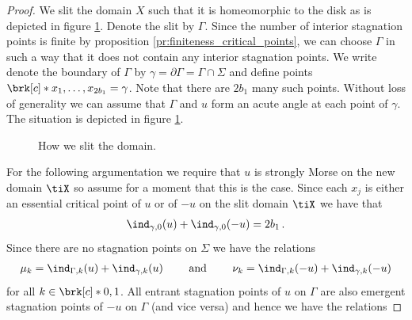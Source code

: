 \begin{proof}
  We slit the domain $X$ such that it is homeomorphic to the disk as is 
  depicted in figure \ref{fi:n2_hvf_slitDomain}.
  Denote the slit by $\Gamma$. Since the number of interior stagnation points is 
  finite by proposition \ref{pr:finiteness_critical_points}, we can choose $\Gamma$ in such a way that it does not contain
  any interior stagnation points.
  We write denote the boundary of $\Gamma$ by $\gamma=\partial\Gamma=\Gamma\cap\Sigma$
  and define points $\brk[c]*{x_1,\dots,x_{2b_1}}=\gamma$.
  Note that there are $2b_1$ many such points.
  Without loss of generality we can assume that $\Gamma$ and $u$ form an acute angle at each point of $\gamma$.
  The situation is depicted in figure \ref{fi:n2_hvf_slitDomain}.
  \begin{figure}
    \centering
    
    \caption{How we slit the domain.}
    \label{fi:n2_hvf_slitDomain}
  \end{figure}
  For the following argumentation we require that $u$ is strongly Morse on the new domain $\tiX$ 
  so assume for a moment that this is the case.
  Since each $x_j$ is either an essential critical point of $u$ or of $-u$ on the slit domain $\tiX$ we have that
  \begin{align}
    \ind_{\gamma,0}(u)+\ind_{\gamma,0}(-u)=2b_1\,.\label{eq:n2_hvf_noInflowNoOutflow_relgamma}
  \end{align}
  Since there are no stagnation points on $\Sigma$ we have the relations
  \begin{align}
    \mu_k=\ind_{\Gamma,k}(u)+\ind_{\gamma,k}(u) \qquad\text{ and }\qquad
    \nu_k=\ind_{\Gamma,k}(-u)+\ind_{\gamma,k}(-u)\label{eq:n2_hvf_noInflowNoOutflow_relationsMuIndex}
  \end{align}
  for all $k\in\brk[c]*{0,1}$.
  All entrant stagnation points of $u$ on $\Gamma$ are also emergent
  stagnation points of $-u$ on $\Gamma$ (and vice versa) and hence we have the relations

\end{proof}
